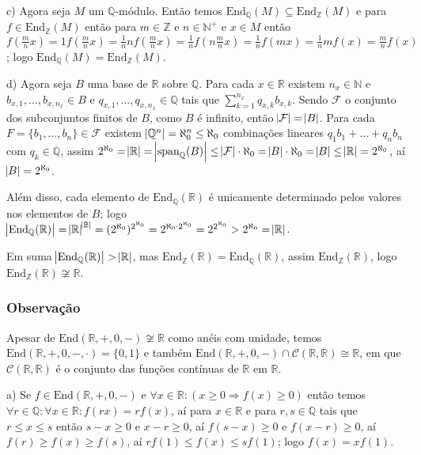 \documentclass[10pt,a4paper]{article}
\begin{document}
\medskip
\noindent
c) Agora seja $M$ um $\mathbb{Q}$-módulo. Então temos $\mathrm{End}_\mathbb{Q}(M)\subseteq\mathrm{End}_\mathbb{Z}(M)$ e para $f\in\mathrm{End}_\mathbb{Z}(M)$ então para $m\in\mathbb{Z}$ e $n\in\mathbb{N}^+$ e $x\in M$ então $f(\frac{m}{n}x)=1f(\frac{m}{n}x)=\frac{1}{n}nf(\frac{m}{n}x)=\frac{1}{n}f(n\frac{m}{n}x)=\frac{1}{n}f(mx)=\frac{1}{n}mf(x)=\frac{m}{n}f(x)$; logo $\mathrm{End}_\mathbb{Q}(M)=\mathrm{End}_\mathbb{Z}(M)$.

\medskip
\noindent
d) Agora seja $B$ uma base de $\mathbb{R}$ sobre $\mathbb{Q}$. Para cada $x\in\mathbb{R}$ existem $n_x\in\mathbb{N}$ e $b_{x,1},\dots,b_{x,n_x}\in B$ e $q_{x,1},\dots,q_{x,n_x}\in\mathbb{Q}$ tais que $\sum_{k=1}^{n_x}q_{x,k}b_{x,k}$. Sendo $\mathcal{F}$ o conjunto dos subconjuntos finitos de $B$, como $B$ é infinito, então $\abs{\mathcal{F}}=\abs{B}$. Para cada $F=\{b_1,\dots,b_n\}\in\mathcal{F}$ existem $\abs{\mathbb{Q}^n}=\aleph_0^n\leq\aleph_0$ combinações lineares $q_1b_1+\dots+q_nb_n$ com $q_k\in\mathbb{Q}$, assim $2^{\aleph_0}=\abs{\mathbb{R}}=\abs{\mathrm{span}_\mathbb{Q}(B)}\leq\abs{\mathcal{F}}\cdot\aleph_0=\abs{B}\cdot\aleph_0=\abs{B}\leq\abs{\mathbb{R}}=2^{\aleph_0}$, aí $\abs{B}=2^{\aleph_0}$.

\medskip
\noindent
Além disso, cada elemento de $\mathrm{End}_\mathbb{Q}(\mathbb{R})$ é unicamente determinado pelos valores nos elementos de $B$; logo $\abs{\mathrm{End}_\mathbb{Q}(\mathbb{R})}=\abs{\mathbb{R}}^{\abs{\mathbb{B}}}=(2^{\aleph_0})^{2^{\aleph_0}}=2^{\aleph_0\cdot 2^{\aleph_0}}=2^{2^{\aleph_0}}>2^{\aleph_0}=\abs{\mathbb{R}}$.

\medskip
\noindent
Em suma $\abs{\mathrm{End}_\mathbb{Q}(\mathbb{R})}>\abs{\mathbb{R}}$, mas $\mathrm{End}_\mathbb{Z}(\mathbb{R})=\mathrm{End}_\mathbb{Q}(\mathbb{R})$, assim $\mathrm{End}_\mathbb{Z}(\mathbb{R})$, logo $\mathrm{End}_\mathbb{Z}(\mathbb{R})\not\cong\mathbb{R}$.

\subsubsection*{Observação}

Apesar de $\mathrm{End}(\mathbb{R},+,0,-)\not\cong\mathbb{R}$ como anéis com unidade, temos $\mathrm{End}(\mathbb{R},+,0,-,\cdot)=\{0,1\}$ e também $\mathrm{End}(\mathbb{R},+,0,-)\cap\mathcal{C}(\mathbb{R},\mathbb{R})\cong\mathbb{R}$, em que $\mathcal{C}(\mathbb{R},\mathbb{R})$ é o conjunto das funções contínuas de $\mathbb{R}$ em $\mathbb{R}$.

\medskip
\noindent
a) Se $f\in\mathrm{End}(\mathbb{R},+,0,-)$ e $\forall x\in\mathbb{R}:(x\geq 0\Rightarrow f(x)\geq 0)$ então temos $\forall r\in\mathbb{Q}:\forall x\in\mathbb{R}:f(rx)=rf(x)$, aí para $x\in\mathbb{R}$ e para $r,s\in\mathbb{Q}$ tais que $r\leq x\leq s$ então $s-x\geq 0$ e $x-r\geq 0$, aí $f(s-x)\geq 0$ e $f(x-r)\geq 0$, aí $f(r)\geq f(x)\geq f(s)$, aí $rf(1)\leq f(x)\leq sf(1)$; logo $f(x)=xf(1)$.
\end{document}
